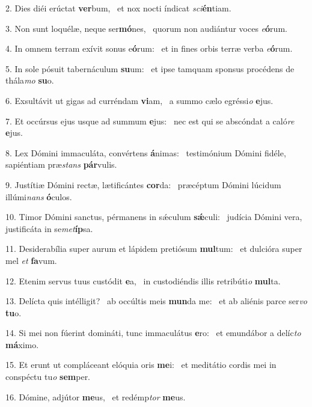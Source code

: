 2. Dies diéi erúctat \textbf{ver}bum, \ast\  et nox nocti índicat \textit{sci}\textbf{én}tiam.\

3. Non sunt loquélæ, neque ser\textbf{mó}nes, \ast\  quorum non audiántur voces \textit{e}\textbf{ó}rum.\

4. In omnem terram exívit sonus e\textbf{ó}rum: \ast\  et in fines orbis terræ verba \textit{e}\textbf{ó}rum.\

5. In sole pósuit tabernáculum \textbf{su}um: \ast\  et ipse tamquam sponsus procédens de thála\textit{mo} \textbf{su}o.\

6. Exsultávit ut gigas ad curréndam \textbf{vi}am, \ast\  a summo cælo egréssi\textit{o} \textbf{e}jus.\

7. Et occúrsus ejus usque ad summum \textbf{e}jus: \ast\  nec est qui se abscóndat a caló\textit{re} \textbf{e}jus.\

8. Lex Dómini immaculáta, convértens \textbf{á}nimas: \ast\  testimónium Dómini fidéle, sapiéntiam præ\textit{stans} \textbf{pár}vulis.\

9. Justítiæ Dómini rectæ, lætificántes \textbf{cor}da: \ast\  præcéptum Dómini lúcidum illúmi\textit{nans} \textbf{ó}culos.\

10. Timor Dómini sanctus, pérmanens in sǽculum \textbf{sǽ}culi: \ast\  judícia Dómini vera, justificáta in se\textit{met}\textbf{íp}sa.\

11. Desiderabília super aurum et lápidem pretiósum \textbf{mul}tum: \ast\  et dulcióra super mel \textit{et} \textbf{fa}vum.\

12. Etenim servus tuus custódit \textbf{e}a, \ast\  in custodiéndis illis retribúti\textit{o} \textbf{mul}ta.\

13. Delícta quis intélligit? \dag\  ab occúltis meis \textbf{mun}da me: \ast\  et ab aliénis parce ser\textit{vo} \textbf{tu}o.\

14. Si mei non fúerint domináti, tunc immaculátus \textbf{e}ro: \ast\  et emundábor a delíc\textit{to} \textbf{má}ximo.\

15. Et erunt ut compláceant elóquia oris \textbf{me}i: \ast\  et meditátio cordis mei in conspéctu tu\textit{o} \textbf{sem}per.\

16. Dómine, adjútor \textbf{me}us, \ast\  et redémp\textit{tor} \textbf{me}us.\

